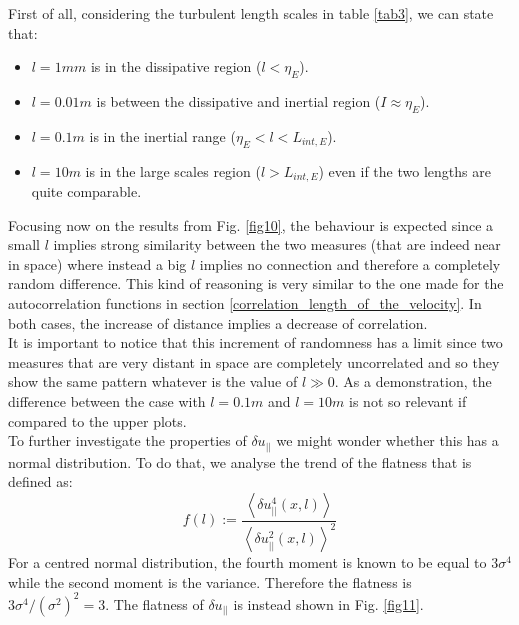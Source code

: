 \documentclass[11pt,titlepage]{article}
\begin{document}
First of all, considering the turbulent length scales in table \ref{tab3}, we can state that:
\begin{itemize}
	\item $l=1mm$ is in the dissipative region ($l<\eta_E$).
	\item $l=0.01m$ is between the dissipative and inertial region ($I \approx \eta_E$).
	\item $l=0.1m$ is in the inertial range ($\eta_E < l < L_{int,E}$).
	\item $l=10m$ is in the large scales region ($l > L_{int,E}$) even if the two lengths are quite comparable.
\end{itemize}

Focusing now on the results from Fig. \ref{fig10}, the behaviour is expected since a small $l$ implies strong similarity between the two measures (that are indeed near in space) where instead a big $l$ implies no connection and therefore a completely random difference. This kind of reasoning is very similar to the one made for the autocorrelation functions in section \ref{correlation_length_of_the_velocity}. In both cases, the increase of distance implies a decrease of correlation. \\
It is important to notice that this increment of randomness has a limit since two measures that are very distant in space are completely uncorrelated and so they show the same pattern whatever is the value of $l\gg0$. As a demonstration, the difference between the case with $l=0.1m$ and $l=10m$ is not so relevant if compared to the upper plots. \\
To further investigate the properties of $\delta u_{||}$ we might wonder whether this has a normal distribution. To do that, we analyse the trend of the flatness that is defined as:
\begin{equation*}
	f(l) := \frac{\left<\delta u_{||}^4(x,l)\right>}{{\left<\delta u_{||}^2(x,l)\right>}^2}
\end{equation*}
For a centred normal distribution, the fourth moment is known to be equal to $3\sigma^4$ while the second moment is the variance. Therefore the flatness is $3\sigma^4/(\sigma^2)^2 = 3$. The flatness of $\delta u_{||}$ is instead shown in Fig. \ref{fig11}.
\newpage
\end{document}
